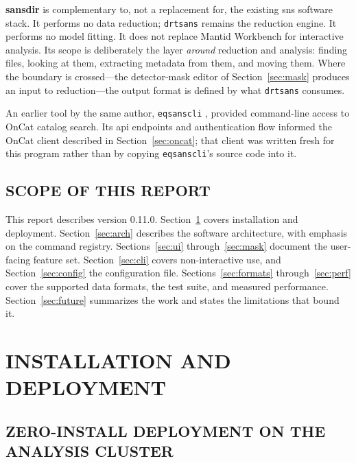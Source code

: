 \documentclass[tm]{ornltm}
\begin{document}
\textbf{sansdir} is complementary to, not a replacement for, the existing
\ac{sns} software stack. It performs no data reduction; \texttt{drtsans} remains
the reduction engine. It performs no model fitting. It does not replace Mantid
Workbench for interactive analysis. Its scope is deliberately the layer
\emph{around} reduction and analysis: finding files, looking at them, extracting
metadata from them, and moving them. Where the boundary is crossed---the
detector-mask editor of Section~\ref{sec:mask} produces an input to
reduction---the output format is defined by what \texttt{drtsans} consumes.

An earlier tool by the same author, \texttt{eqsanscli} \autocite{eqsanscli},
provided command-line access to OnCat catalog search. Its \ac{api} endpoints and
authentication flow informed the OnCat client described in
Section~\ref{sec:oncat}; that client was written fresh for this program rather
than by copying \texttt{eqsanscli}'s source code into it.

\subsection{SCOPE OF THIS REPORT}

This report describes version 0.11.0. Section~\ref{sec:install} covers
installation and deployment. Section~\ref{sec:arch} describes the software
architecture, with emphasis on the command registry. Sections~\ref{sec:ui}
through~\ref{sec:mask} document the user-facing feature set. Section~\ref{sec:cli}
covers non-interactive use, and Section~\ref{sec:config} the configuration file.
Sections~\ref{sec:formats} through~\ref{sec:perf} cover the supported data
formats, the test suite, and measured performance. Section~\ref{sec:future}
summarizes the work and states the limitations that bound it.

\section{INSTALLATION AND DEPLOYMENT}
\label{sec:install}

\subsection{ZERO-INSTALL DEPLOYMENT ON THE ANALYSIS CLUSTER}
\end{document}
